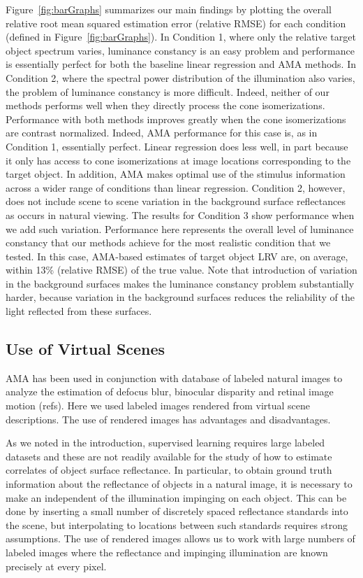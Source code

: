 \documentclass{jov}
\begin{document}
Figure~\ref{fig:barGraphs} summarizes our main findings by plotting the overall relative root mean squared estimation error (relative RMSE) for each condition (defined in Figure~\ref{fig:barGraphs}). 
In Condition 1, where only the relative target object spectrum varies, luminance constancy is an easy problem and performance is essentially perfect for both the baseline linear regression and AMA methods.
In Condition 2, where the spectral power distribution of the illumination also varies, the problem of luminance constancy is more difficult.
Indeed, neither of our methods performs well when they directly process the cone isomerizations.
Performance with both methods improves greatly when the cone isomerizations are contrast normalized. 
Indeed, AMA performance for this case is, as in Condition 1, essentially perfect.
Linear regression does less well, in part because it only has access to cone isomerizations at image locations
corresponding to the target object.
In addition, AMA makes optimal use of the stimulus information across a wider range
of conditions than linear regression.
Condition 2, however, does not include scene to scene variation in the background surface reflectances
as occurs in natural viewing.
The results for Condition 3 show performance when we add such variation.
Performance here represents the overall level of luminance constancy that our methods achieve for the
most realistic condition that we tested.
In this case, AMA-based estimates of target object LRV are, on average, within 13\% (relative RMSE) of the true value.
Note that introduction of variation in the background surfaces makes the luminance constancy problem substantially harder,
because variation in the background surfaces reduces the reliability of the light reflected from these
surfaces.

\subsection{Use of Virtual Scenes}

AMA has been used in conjunction with database of labeled natural images to analyze the estimation of defocus blur,
binocular disparity and retinal image motion (refs).
Here we used labeled images rendered from virtual scene descriptions.
The use of rendered images has advantages and disadvantages.

As we noted in the introduction, supervised learning requires large labeled datasets and these are not readily available 
for the study of how to estimate correlates of object surface reflectance.
In particular, to obtain ground truth information about the reflectance of objects in a natural image, it is necessary to
make an independent of the illumination impinging on each object.
This can be done by inserting a small number of discretely spaced reflectance standards into the scene, but 
interpolating to locations between such standards requires strong assumptions.
The use of rendered images allows us to work with large numbers of labeled images where the reflectance
and impinging illumination are known precisely at every pixel.
\end{document}
